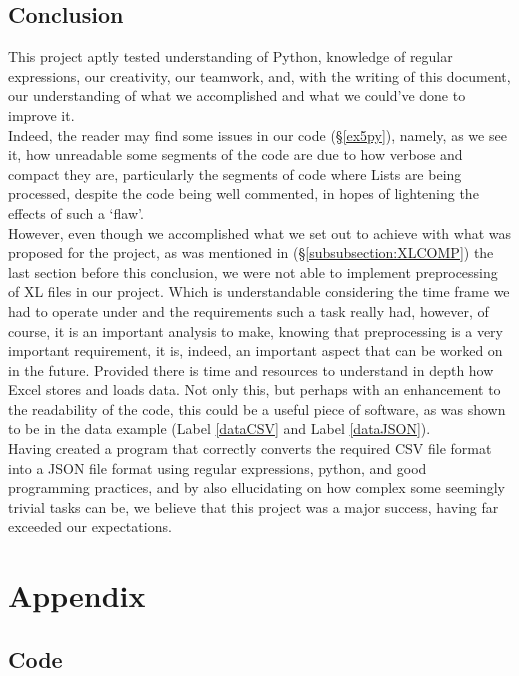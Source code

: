 \documentclass[11pt,a4paper,times]{report}
\begin{document}
\section{Conclusion} \label{conclusion}
This project aptly tested understanding of Python, knowledge of regular expressions,
our creativity, our teamwork, and, with the writing of this document,
our understanding of what we accomplished and what we could've done to improve it.\\
Indeed, the reader may find some issues in our code (\S\ref{ex5py}), namely, as we see it,
how unreadable some segments of the code are due to how verbose and compact they are,
particularly the segments of code where Lists are being processed, despite the code being
well commented, in hopes of lightening the effects of such a `flaw'.\\
However, even though we accomplished what we set out to achieve with what was proposed for the
project, as was mentioned in (\S\ref{subsubsection:XLCOMP}) the last section before this conclusion,
we were not able to implement preprocessing of XL files in our project.
Which is understandable considering the time frame we had to operate under and
the requirements such a task really had, however, of course, it is an important analysis to make,
knowing that preprocessing is a very important requirement, it is, indeed, an important aspect
that can be worked on in the future. Provided there is time and resources to understand in depth
how Excel stores and loads data. Not only this, but perhaps with an enhancement to the readability
of the code, this could be a useful piece of software, as was shown to be in the data example
(Label \ref{dataCSV} and Label \ref{dataJSON}).\\
Having created a program that correctly converts the required CSV file format
into a JSON file format using regular expressions, python, and good programming practices, and
by also ellucidating on how complex some seemingly trivial tasks can be,
we believe that this project was a major success, having far exceeded our expectations.


\chapter{Appendix} \label{chap:code}
\section{Code}

{}

\end{document}
